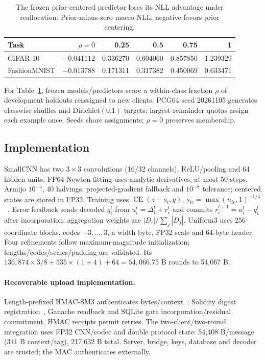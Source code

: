 \begin{table}[!htb]\centering\small
\caption{The frozen prior-centered predictor loses its NLL advantage under reallocation. Prior-minus-zero macro NLL; negative favors prior centering.}\label{tab:drift}
\begin{tabular}{lrrrrr}\toprule
Task & $\rho=0$ & 0.25 & 0.5 & 0.75 & 1\\\midrule
CIFAR-10 & $-0.041112$ & 0.336270 & 0.604060 & 0.857850 & 1.239329\\
FashionMNIST & $-0.013788$ & 0.171311 & 0.317382 & 0.450069 & 0.633471\\\bottomrule
\end{tabular}\end{table}
For Table~\ref{tab:drift}, frozen models/predictors score a within-class fraction $\rho$ of development holdouts reassigned to new clients. PCG64 seed 20261105 generates classwise shuffles and Dirichlet$(0.1)$ targets; largest-remainder quotas assign each example once. Seeds share assignments; $\rho=0$ preserves membership.

\subsection*{Implementation}\label{app:implementation}
SmallCNN has two $3\times3$ convolutions (16/32 channels), ReLU/pooling and 64 hidden units. FP64 Newton fitting uses analytic derivatives, at most 50 steps, Armijo $10^{-4}$, 40 halvings, projected-gradient fallback and $10^{-8}$ tolerance; centered states are stored in FP32. Training uses $\operatorname{CE}(z-s_i,y)$, $s_{ic}=\max(n_{ic},1)^{-1/4}$~\cite{zhang2022fedlc}. Error feedback sends decoded $q_i^t$ from $u_i^t=\Delta_i^t+r_i^t$ and commits $r_i^{t+1}=u_i^t-q_i^t$ after incorporation; aggregation weights are $|D_i|/\sum_j|D_j|$. Uniform3 uses 256-coordinate blocks, codes $-3,\ldots,3$, a width byte, FP32 scale and 64-byte header. Four refinements follow maximum-magnitude initialization; lengths/codes/scales/padding are validated. Its $136{,}874\times3/8+535\times(1+4)+64=54{,}066.75$ B rounds to 54,067 B.

\paragraph{Recoverable upload implementation.}
Length-prefixed HMAC-SM3 authenticates bytes/context~\cite{rfc2104,shen2018sm3}; Solidity digest registration~\cite{kim2020blockfl}, Ganache readback and SQLite gate incorporation/residual commitment. HMAC receipts permit retries. The two-client/two-round integration uses FP32 CNN/codec and double protocol state: 54,408 B/message (341 B context/tag), 217,632 B total. Server, bridge, keys, database and decoder are trusted; the MAC authenticates externally.
